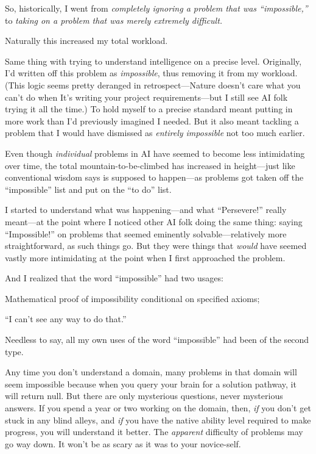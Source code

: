 {
 So, historically, I went from \textit{completely ignoring a
problem that was ``impossible,''} to
\textit{taking on a problem that was merely extremely difficult.}}

{
 Naturally this increased my total workload.}

{
 Same thing with trying to understand intelligence on a precise
level. Originally, I'd written off this problem as
\textit{impossible}, thus removing it from my workload. (This logic
seems pretty deranged in retrospect---Nature doesn't
care what you can't do when It's
writing your project requirements---but I still see AI folk trying it
all the time.) To hold myself to a precise standard meant putting in
more work than I'd previously imagined I needed. But it
also meant tackling a problem that I would have dismissed as
\textit{entirely impossible} not too much earlier.}

{
 Even though \textit{individual} problems in AI have seemed to
become less intimidating over time, the total mountain-to-be-climbed
has increased in height---just like conventional wisdom says is
supposed to happen---as problems got taken off the
``impossible'' list and put on the
``to do'' list.}

{
 I started to understand what was happening---and what
``Persevere!'' really meant---at the
point where I noticed other AI folk doing the same thing: saying
``Impossible!'' on problems that
seemed eminently solvable---relatively more straightforward, as such
things go. But they were things that \textit{would} have seemed vastly
more intimidating at the point when I first approached the problem.}

{
 And I realized that the word
``impossible'' had two usages:}

{
 Mathematical proof of impossibility conditional on specified
axioms;}

{
 ``I can't see any way to do
that.''}

{
 Needless to say, all my own uses of the word
``impossible'' had been of the
second type.}

{
 Any time you don't understand a domain, many
problems in that domain will seem impossible because when you query
your brain for a solution pathway, it will return null. But there are
only mysterious questions, never mysterious answers. If you spend a
year or two working on the domain, then, \textit{if} you
don't get stuck in any blind alleys, and \textit{if}
you have the native ability level required to make progress, you will
understand it better. The \textit{apparent} difficulty of problems may
go way down. It won't be as scary as it was to your
novice-self.}

